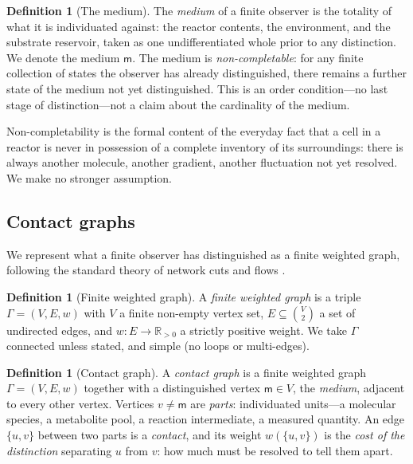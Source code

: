 \documentclass[11pt,twocolumn,a4paper]{article}
\theoremstyle{thmstyle}
\theoremstyle{definition}
\newtheorem{definition}[theorem]{Definition}
\theoremstyle{remark}
\newcommand{\R}{\mathbb{R}}
\newcommand{\Gph}{\Gamma}
\newcommand{\V}{V}
\newcommand{\E}{E}
\newcommand{\wt}{w}
\newcommand{\med}{\mathsf{m}}
\begin{document}
\begin{definition}[The medium]
\label{def:medium}
The \emph{medium} of a finite observer is the totality of what it is
individuated against: the reactor contents, the environment, and the
substrate reservoir, taken as one undifferentiated whole prior to any
distinction. We denote the medium $\med$. The medium is
\emph{non-completable}: for any finite collection of states the observer
has already distinguished, there remains a further state of the medium not
yet distinguished. This is an order condition---no last stage of
distinction---not a claim about the cardinality of the medium.
\end{definition}

Non-completability is the formal content of the everyday fact that a cell
in a reactor is never in possession of a complete inventory of its
surroundings: there is always another molecule, another gradient, another
fluctuation not yet resolved. We make no stronger assumption.

\subsection{Contact graphs}

We represent what a finite observer has distinguished as a finite weighted
graph, following the standard theory of network cuts and flows
\citep{diestel2017graph,fordfulkerson1956maximal}.

\begin{definition}[Finite weighted graph]
\label{def:graph}
A \emph{finite weighted graph} is a triple $\Gph=(\V,\E,\wt)$ with $\V$ a
finite non-empty vertex set, $\E\subseteq\binom{\V}{2}$ a set of undirected
edges, and $\wt\colon\E\to\R_{>0}$ a strictly positive weight. We take
$\Gph$ connected unless stated, and simple (no loops or multi-edges).
\end{definition}

\begin{definition}[Contact graph]
\label{def:contact}
A \emph{contact graph} is a finite weighted graph
$\Gph=(\V,\E,\wt)$ together with a distinguished vertex $\med\in\V$, the
\emph{medium}, adjacent to every other vertex. Vertices $v\neq\med$ are
\emph{parts}: individuated units---a molecular species, a metabolite pool,
a reaction intermediate, a measured quantity. An edge $\{u,v\}$ between two
parts is a \emph{contact}, and its weight $\wt(\{u,v\})$ is the
\emph{cost of the distinction} separating $u$ from $v$: how much must be
resolved to tell them apart.
\end{definition}
\end{document}
